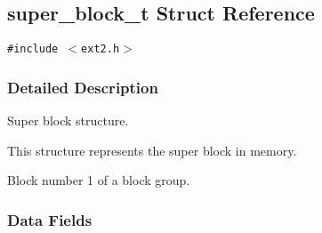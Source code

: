\hypertarget{structsuper__block__t}{
\subsection{super\_\-block\_\-t Struct Reference}
\label{structsuper__block__t}
}
{\tt \#include $<$ext2.h$>$}



\subsubsection{Detailed Description}
Super block structure.

This structure represents the super block in memory.

Block number 1 of a block group. 

\subsubsection*{Data Fields}
